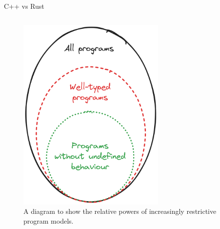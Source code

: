 \documentclass[10pt,aspectratio=169]{beamer}
\begin{document}
\begin{frame}{C++ vs Rust}
\begin{columns}[onlytextwidth]
\begin{figure}[H]
                \includegraphics[width=0.65\textwidth]{images/excalidraw_programs_venn.png}
                \caption{A diagram to show the relative powers of increasingly restrictive program models.}
            \label{fig:warwick_mantevo_link}
        \end{figure}
    \end{columns}
\end{frame}

\end{document}
